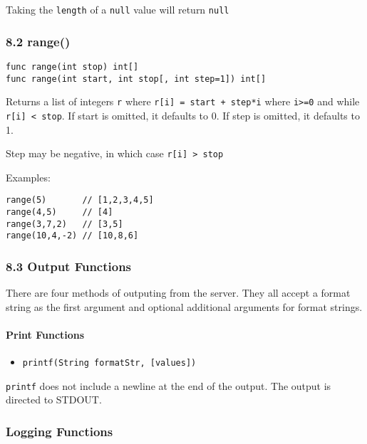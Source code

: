 Taking the \texttt{length} of a \texttt{null} value will return
\texttt{null}

\subsubsection{8.2 range()}\label{range}

\begin{verbatim}
func range(int stop) int[]
func range(int start, int stop[, int step=1]) int[]
\end{verbatim}

Returns a list of integers \texttt{r} where
\texttt{r{[}i{]} = start + step*i} where \texttt{i\textgreater{}=0} and
while \texttt{r{[}i{]} \textless{} stop}. If start is omitted, it
defaults to 0. If step is omitted, it defaults to 1.

Step may be negative, in which case
\texttt{r{[}i{]} \textgreater{} stop}

Examples:

\begin{verbatim}
range(5)       // [1,2,3,4,5]
range(4,5)     // [4]
range(3,7,2)   // [3,5]
range(10,4,-2) // [10,8,6]
\end{verbatim}

\subsubsection{8.3 Output Functions}\label{output-functions}

There are four methods of outputing from the server. They all accept a
format string as the first argument and optional additional arguments
for format strings.

\paragraph{Print Functions}\label{print-functions}

\begin{itemize}
\itemsep1pt\parskip0pt
\item
  \texttt{printf(String formatStr, {[}values{]})}
\end{itemize}

\texttt{printf} does not include a newline at the end of the output. The
output is directed to STDOUT.

\subsubsection{Logging Functions}\label{logging-functions}

